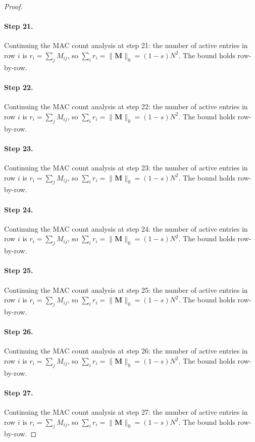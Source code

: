 \begin{proof}
\paragraph{Step 21.}
Continuing the MAC count analysis at step 21:
the number of active entries in row $i$ is $r_i = \sum_j M_{ij}$, so
$\sum_i r_i = \|\mathbf{M}\|_0 = (1-s)N^2$.  The bound holds row-by-row.

\paragraph{Step 22.}
Continuing the MAC count analysis at step 22:
the number of active entries in row $i$ is $r_i = \sum_j M_{ij}$, so
$\sum_i r_i = \|\mathbf{M}\|_0 = (1-s)N^2$.  The bound holds row-by-row.

\paragraph{Step 23.}
Continuing the MAC count analysis at step 23:
the number of active entries in row $i$ is $r_i = \sum_j M_{ij}$, so
$\sum_i r_i = \|\mathbf{M}\|_0 = (1-s)N^2$.  The bound holds row-by-row.

\paragraph{Step 24.}
Continuing the MAC count analysis at step 24:
the number of active entries in row $i$ is $r_i = \sum_j M_{ij}$, so
$\sum_i r_i = \|\mathbf{M}\|_0 = (1-s)N^2$.  The bound holds row-by-row.

\paragraph{Step 25.}
Continuing the MAC count analysis at step 25:
the number of active entries in row $i$ is $r_i = \sum_j M_{ij}$, so
$\sum_i r_i = \|\mathbf{M}\|_0 = (1-s)N^2$.  The bound holds row-by-row.

\paragraph{Step 26.}
Continuing the MAC count analysis at step 26:
the number of active entries in row $i$ is $r_i = \sum_j M_{ij}$, so
$\sum_i r_i = \|\mathbf{M}\|_0 = (1-s)N^2$.  The bound holds row-by-row.

\paragraph{Step 27.}
Continuing the MAC count analysis at step 27:
the number of active entries in row $i$ is $r_i = \sum_j M_{ij}$, so
$\sum_i r_i = \|\mathbf{M}\|_0 = (1-s)N^2$.  The bound holds row-by-row.


\end{proof}
